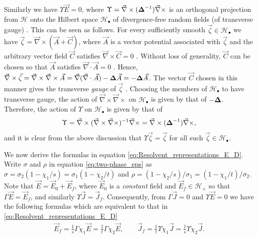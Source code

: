 \documentclass{cmslatex}
\newcommand\bDelta{\mbox{\boldmath${\Delta}$}}
\begin{document}
Similarly we have $\Upsilon\vec{E}=0$, where
$\Upsilon=\vec{\nabla}\times(\bDelta^{-1})\vec{\nabla}\times$ is an orthogonal projection from 
$\mathscr{H}$ onto the Hilbert space \cite{Golden:CMP-473}
$\mathscr{H}_{\bullet}$ of divergence-free random fields (of transverse
gauge) \cite{Murphy:JMP:063506}. This can be seen as  
follows. For every sufficiently smooth $\vec{\zeta}\in\mathscr{H}_\bullet$ we have
$\vec{\zeta}=\vec{\nabla}\times(\vec{A}+\vec{C})$, where $\vec{A}$ is a vector
potential associated with $\vec{\zeta}$ and the arbitrary vector field
$\vec{C}$ satisfies $\vec{\nabla}\times\vec{C}=0$ \cite{Jackson-1999}. Without
loss of generality, $\vec{C}$ can be chosen so that $\vec{A}$
satisfies $\vec{\nabla}\cdot\vec{A}=0$ \cite{Jackson-1999}. Hence,
$\vec{\nabla}\times\vec{\zeta}=\vec{\nabla}\times\vec{\nabla}\times\vec{A}
=\vec{\nabla}(\vec{\nabla}\cdot\vec{A})-\bDelta\vec{A}=-\bDelta\vec{A}$. The vector 
$\vec{C}$ chosen in this manner gives the transverse \emph{gauge} of
$\vec{\zeta}$ \cite{Jackson-1999}. Choosing the members of 
$\mathscr{H}_\bullet$ to have transverse gauge, the action of
$\vec{\nabla}\times\vec{\nabla}\times$ on $\mathscr{H}_\bullet$ is given by that of
$-\bDelta$. Therefore, the action of $\Upsilon$ on $\mathscr{H}_\bullet$ is given
by that of 
%
\begin{align}\label{eq:GammaCurl}
  \Upsilon=\vec{\nabla}\times(\vec{\nabla}\times\vec{\nabla}\times)^{-1}\vec{\nabla}\times
  =\vec{\nabla}\times(\bDelta^{-1})\vec{\nabla}\times, 
\end{align}
%
and it is clear from the above discussion that $\Upsilon\vec{\zeta}=\vec{\zeta}$ for
all such $\vec{\zeta}\in\mathscr{H}_\bullet$.





We now derive the formulas in equation
\eqref{eq:Resolvent_representations_E_D}.
Write $\sigma$ and $\rho$ in 
equation \eqref{eq:two-phase_eps} as $\sigma=\sigma_2(1-\chi_1/s)=\sigma_1(1-\chi_2/t)$ and
$\rho=(1-\chi_2/s)/\sigma_1=(1-\chi_1/t)/\sigma_2$. Note that
$\vec{E}=\vec{E}_0+\vec{E}_f$, where $\vec{E}_0$ is a \emph{constant}
field and $\vec{E}_f\in\mathscr{H}_\times$ so that
$\Gamma\vec{E}=\vec{E}_f$, and similarly
$\Upsilon\vec{J}=\vec{J}_f$. Consequently, from $\Gamma\vec{J}=0$ and $\Upsilon\vec{E}=0$
we have the following formulas which are equivalent to that in 
\eqref{eq:Resolvent_representations_E_D}  
% 
\begin{align}\label{eq:Proj_rep_Ef_Jf}
  \vec{E}_f=\frac{1}{s}\Gamma\chi_1\vec{E}=\frac{1}{t}\Gamma\chi_2\vec{E}, \qquad
  \vec{J}_f=\frac{1}{t}\Upsilon\chi_1\vec{J}=\frac{1}{s}\Upsilon\chi_2\vec{J}.
\end{align}
%
\end{document}
